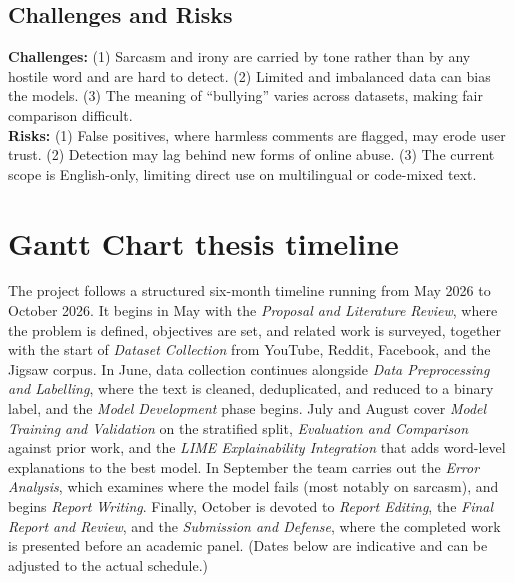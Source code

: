 \documentclass[12pt,a4paper]{article}
\begin{document}
\subsection{Challenges and Risks}
\textbf{Challenges:} (1) Sarcasm and irony are carried by tone rather than by any hostile word and are hard to detect. (2) Limited and imbalanced data can bias the models. (3) The meaning of ``bullying'' varies across datasets, making fair comparison difficult.\\
\textbf{Risks:} (1) False positives, where harmless comments are flagged, may erode user trust. (2) Detection may lag behind new forms of online abuse. (3) The current scope is English-only, limiting direct use on multilingual or code-mixed text.

\section{Gantt Chart thesis timeline}
The project follows a structured six-month timeline running from May 2026 to October 2026. It begins in May with the \emph{Proposal and Literature Review}, where the problem is defined, objectives are set, and related work is surveyed, together with the start of \emph{Dataset Collection} from YouTube, Reddit, Facebook, and the Jigsaw corpus. In June, data collection continues alongside \emph{Data Preprocessing and Labelling}, where the text is cleaned, deduplicated, and reduced to a binary label, and the \emph{Model Development} phase begins. July and August cover \emph{Model Training and Validation} on the stratified split, \emph{Evaluation and Comparison} against prior work, and the \emph{LIME Explainability Integration} that adds word-level explanations to the best model. In September the team carries out the \emph{Error Analysis}, which examines where the model fails (most notably on sarcasm), and begins \emph{Report Writing}. Finally, October is devoted to \emph{Report Editing}, the \emph{Final Report and Review}, and the \emph{Submission and Defense}, where the completed work is presented before an academic panel. (Dates below are indicative and can be adjusted to the actual schedule.)
\end{document}
